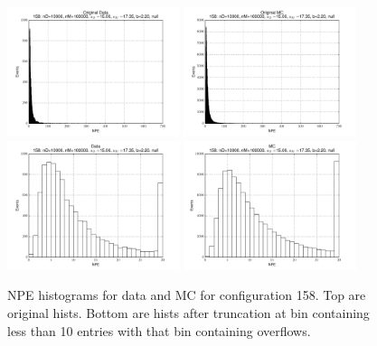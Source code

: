  \begin{figure}[htbp] \begin{center} 
\includegraphics[width=0.45\textwidth]{../FIGURES/158/FIG_Original_Data.pdf} 
\includegraphics[width=0.45\textwidth]{../FIGURES/158/FIG_Original_MC.pdf} 
\includegraphics[width=0.45\textwidth]{../FIGURES/158/FIG_Data.pdf} 
\includegraphics[width=0.45\textwidth]{../FIGURES/158/FIG_MC.pdf} 
\caption{NPE histograms for data and MC for configuration 158. Top are original hists. Bottom are hists after truncation at bin containing less than 10 entries with that bin containing overflows.} 
\label{tab:npe_158} 
\end{center} \end{figure} 
\clearpage
 